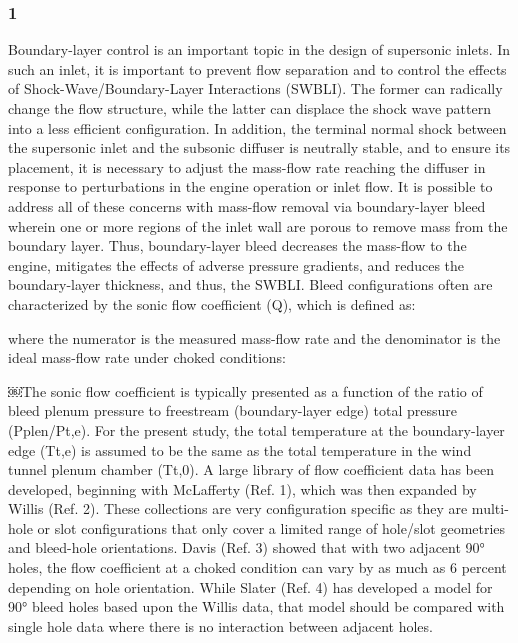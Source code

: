 \subsubsection{1}
Boundary-layer control is an important topic in the design of supersonic inlets. In such an inlet, it is important to prevent flow separation and to control the effects of Shock-Wave/Boundary-Layer Interactions (SWBLI). The former can radically change the flow structure, while the latter can displace the shock wave pattern into a less efficient configuration. In addition, the terminal normal shock between the supersonic inlet and the subsonic diffuser is neutrally stable, and to ensure its placement, it is necessary to adjust the mass-flow rate reaching the diffuser in response to perturbations in the engine operation or inlet flow. It is possible to address all of these concerns with mass-flow removal via boundary-layer bleed wherein one or more regions of the inlet wall are porous to remove mass from the boundary layer. Thus, boundary-layer bleed decreases the mass-flow to the engine, mitigates the effects of adverse pressure gradients, and reduces the boundary-layer thickness, and thus, the SWBLI. Bleed configurations often are characterized by the sonic flow coefficient (Q), which is defined as:


where the numerator is the measured mass-flow rate and the denominator is the ideal mass-flow rate under choked conditions:


￼The sonic flow coefficient is typically presented as a function of the ratio of bleed plenum pressure to freestream (boundary-layer edge) total pressure (Pplen/Pt,e). For the present study, the total temperature at the boundary-layer edge (Tt,e) is assumed to be the same as the total temperature in the wind tunnel plenum chamber (Tt,0).
A large library of flow coefficient data has been developed, beginning with McLafferty (Ref. 1), which was then expanded by Willis (Ref. 2). These collections are very configuration specific as they are multi-hole or slot configurations that only cover a limited range of hole/slot geometries and bleed-hole orientations. Davis (Ref. 3) showed that with two adjacent 90° holes, the flow coefficient at a choked condition can vary by as much as 6 percent depending on hole orientation. While Slater (Ref. 4) has developed a model for 90° bleed holes based upon the Willis data, that model should be compared with single hole data where there is no interaction between adjacent holes. \cite{Eichorn2013}

